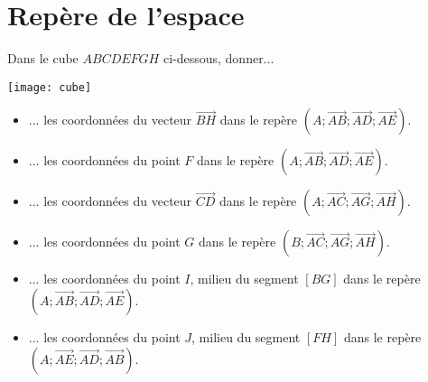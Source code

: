 \documentclass[11pt,fleqn, openany]{book} %
\begin{document}
\section*{Repère de l'espace}

\begin{exercise}
Dans le cube $ABCDEFGH$ ci-dessous, donner...

\begin{minipage}{0.3\linewidth}
 \begin{center}
\texttt{[image: cube]}
\end{center}
\end{minipage}\hfill\begin{minipage}{0.65\linewidth}

\begin{itemize}
\item ... les coordonnées du vecteur $\overrightarrow{BH}$ dans le repère $(A;\overrightarrow{AB};\overrightarrow{AD};\overrightarrow{AE})$.
\vskip5pt
\item ... les coordonnées du point $F$ dans le repère $(A;\overrightarrow{AB};\overrightarrow{AD};\overrightarrow{AE})$.
\vskip5pt
\item ... les coordonnées du vecteur $\overrightarrow{CD}$ dans le repère $(A;\overrightarrow{AC};\overrightarrow{AG};\overrightarrow{AH})$.
\vskip5pt
\item ... les coordonnées du point $G$ dans le repère $(B;\overrightarrow{AC};\overrightarrow{AG};\overrightarrow{AH})$.
\vskip5pt
\item ...  les coordonnées du point $I$, milieu du segment $[BG]$ dans le repère $(A;\overrightarrow{AB};\overrightarrow{AD};\overrightarrow{AE})$.
\vskip5pt
\item ...  les coordonnées du point $J$, milieu du segment $[FH]$ dans le repère $(A;\overrightarrow{AE};\overrightarrow{AD};\overrightarrow{AB})$.
\end{itemize}
\end{minipage}\end{exercise}
\end{document}

